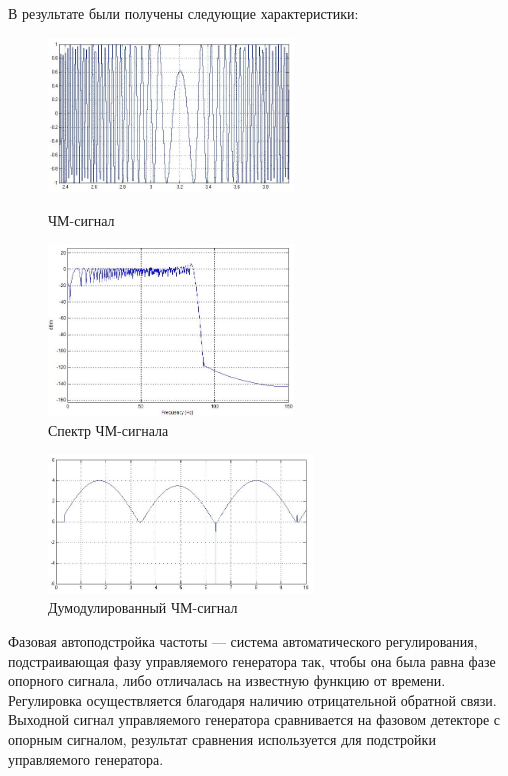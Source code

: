 \documentclass[10pt,a4paper]{article}
\begin{document}
В результате были получены следующие характеристики:
\begin{figure}[h]\centering
  \parbox[b]{0.49\textwidth}{\centering
    \includegraphics[width=6.5cm]{sim_fm} 
    \caption{ЧМ-сигнал}\label{fig.sim_fm}}
  \hfil\hfil 
  \begin{minipage}[b]{0.49\textwidth}
	\centering
	\includegraphics[width=6.5cm]{sim_fms}
	\caption{Спектр ЧМ-сигнала}\label{fig.sim_fms} 
  \end{minipage}
\end{figure}

\begin{figure}[h]\centering
    \includegraphics[width=7cm]{sim_fdm} 
    \caption{Думодулированный ЧМ-сигнал}\label{fig.sim_fdm}
\end{figure}
\FloatBarrier

Фазовая автоподстройка частоты — система автоматического регулирования, подстраивающая фазу управляемого генератора так, чтобы она была равна фазе опорного сигнала, либо отличалась на известную функцию от времени. Регулировка осуществляется благодаря наличию отрицательной обратной связи. Выходной сигнал управляемого генератора сравнивается на фазовом детекторе с опорным сигналом, результат сравнения используется для подстройки управляемого генератора.
\end{document}
